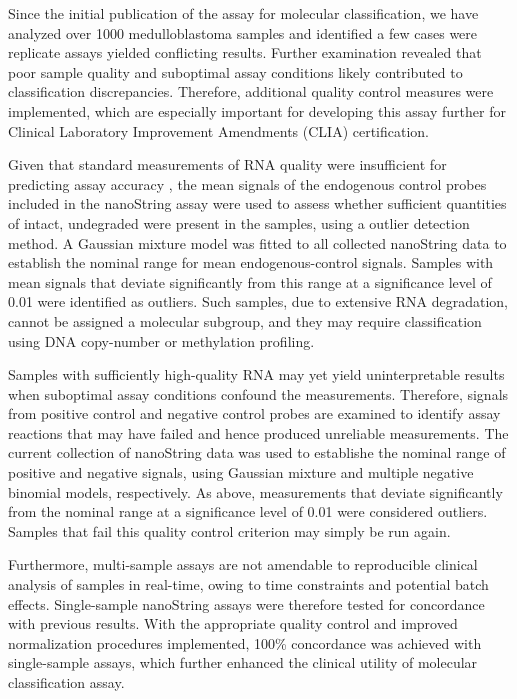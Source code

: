 \documentclass[11pt,letterpaper]{article}
\theoremstyle{definition}
\begin{document}
Since the initial publication of the assay for molecular classification, we have analyzed over 1000 medulloblastoma samples and identified a few cases were replicate assays yielded conflicting results. Further examination revealed that poor sample quality and suboptimal assay conditions likely contributed to classification discrepancies. Therefore, additional quality control measures were implemented, which are especially important for developing this assay further for Clinical Laboratory Improvement Amendments (CLIA) certification.

Given that standard measurements of RNA quality were insufficient for predicting assay accuracy , the mean signals of the endogenous control probes included in the nanoString assay were used to assess whether sufficient quantities of intact, undegraded were present in the samples, using a outlier detection method. A Gaussian mixture model was fitted to all collected nanoString data to establish the nominal range for mean endogenous-control signals. Samples with mean signals that deviate significantly from this range at a significance level of 0.01 were identified as outliers. Such samples, due to extensive RNA degradation, cannot be assigned a molecular subgroup, and they may require classification using DNA copy-number or methylation profiling.

Samples with sufficiently high-quality RNA may yet yield uninterpretable results when suboptimal assay conditions confound the measurements. Therefore, signals from positive control and negative control probes are examined to identify assay reactions that may have failed and hence produced unreliable measurements. The current collection of nanoString data was used to establishe the nominal range of positive and negative signals, using Gaussian mixture and multiple negative binomial models, respectively. As above, measurements that deviate significantly from the nominal range at a significance level of 0.01 were considered outliers. Samples that fail this quality control criterion may simply be run again.

Furthermore, multi-sample assays are not amendable to reproducible clinical analysis of samples in real-time, owing to time constraints and potential batch effects. Single-sample nanoString assays were therefore tested for concordance with previous results. With the appropriate quality control and improved normalization procedures implemented, 100\% concordance was achieved with single-sample assays, which further enhanced the clinical utility of molecular classification assay.
\end{document}
